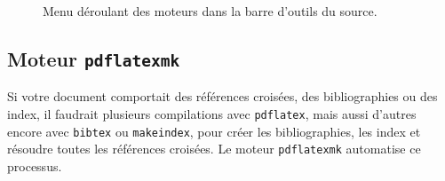 \documentclass[11pt,french]{article}
\newcommand{\TS}{\textsf{\TeX Shop}}
\newcommand{\cmd}[1]{\textsf{#1}}
\begin{document}
\begin{figure}
{}
\caption{Menu déroulant des moteurs dans la barre d'outils du source.\label{EnginesPopup}}
\end{figure}

\subsection{Moteur \texttt{pdflatexmk}}

%

Si votre document comportait des références croisées, des bibliographies ou des index, il faudrait plusieurs compilations avec \texttt{pdflatex}, mais aussi d'autres encore avec \texttt{bibtex} ou \texttt{makeindex}, pour créer les bibliographies, les index et résoudre toutes les références croisées. Le moteur \texttt{pdflatexmk} automatise ce processus.

\end{document}
